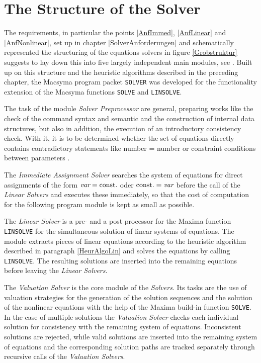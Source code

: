 \section{The Structure of the Solver}

The requirements, in particular the points  \ref{AnfImmed}, \ref{AnfLinear} and
\ref{AnfNonlinear}, set up in  chapter \ref{SolverAnforderungen} and schematically represented the structuring of the equations solvers  in figure \ref{Grobstruktur} suggests to lay down this into five largely independent main modules, see \cite{Trispel}. Built up on this structure and the heuristic algorithms described in the preceding chapter,  the Macsyma program packet \verb+SOLVER+ was developed for the functionality extension of the Macsyma functions \verb+SOLVE+ and \verb+LINSOLVE+.

The task of the module {\em Solver Preprocessor} are general, preparing works like the check of the command syntax and semantic and the construction of internal data structures, but also in addition, the execution of an introductory consistency check. With it, it is to be determined whether the set of equations directly contains contradictory  statements like  number = number or constraint conditions between parameters .

The {\em Immediate Assignment Solver}  searches the system of equations for direct assignments of the form $\mbox{\em var} = \mbox{const.}$ oder $\mbox{const.} = \mbox{\em var}$ before the call of the {\em Linear Solvers}  and executes these immediately, so that the cost of computation  for the following program module is kept as small as possible.

The  {\em Linear Solver} is a pre- and a post processor for the Maxima function \verb+LINSOLVE+  for the simultaneous solution of linear systems of equations. The module extracts  pieces  of linear equations according to the heuristic algorithm described in paragraph \ref{HeurAlgoLin}  and solves the equations by calling \verb+LINSOLVE+. The resulting solutions are inserted into the remaining equations before leaving the {\em Linear Solvers}.

The {\em Valuation Solver} is the core module of the  {\em Solvers}. Its tasks are the use of valuation strategies for the generation of the solution sequences and the solution of the nonlinear equations with the help of the Maxima build-in function \verb+SOLVE+. In the case of multiple solutions the {\em Valuation Solver}  checks each individual solution for consistency with the remaining system of equations. Inconsistent solutions are rejected, while valid solutions are inserted into the remaining system  of equations and the corresponding solution paths are tracked separately through recursive  calls of the {\em Valuation Solvers}.

